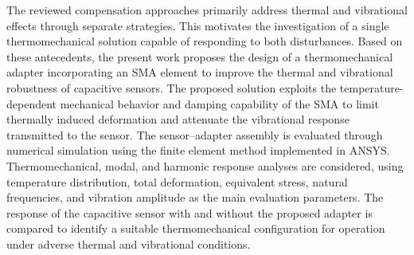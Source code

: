 \documentclass[conference]{IEEEtran}
\begin{document}
The reviewed compensation approaches primarily address thermal and vibrational effects through separate strategies. This motivates the investigation of a single thermomechanical solution capable of responding to both disturbances. Based on these antecedents, the present work proposes the design of a thermomechanical adapter incorporating an SMA element to improve the thermal and vibrational robustness of capacitive sensors. The proposed solution exploits the temperature-dependent mechanical behavior and damping capability of the SMA to limit thermally induced deformation and attenuate the vibrational response transmitted to the sensor. The sensor--adapter assembly is evaluated through numerical simulation using the finite element method implemented in ANSYS. Thermomechanical, modal, and harmonic response analyses are considered, using temperature distribution, total deformation, equivalent stress, natural frequencies, and vibration amplitude as the main evaluation parameters. The response of the capacitive sensor with and without the proposed adapter is compared to identify a suitable thermomechanical configuration for operation under adverse thermal and vibrational conditions.



\end{document}
